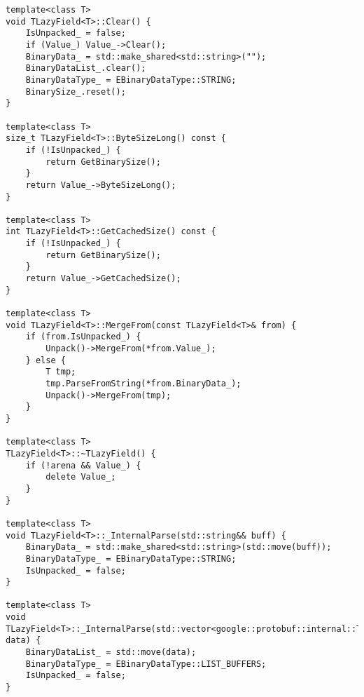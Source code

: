 \begin{lstlisting}[style=CodeListing]
template<class T>
void TLazyField<T>::Clear() {
    IsUnpacked_ = false;
    if (Value_) Value_->Clear();
    BinaryData_ = std::make_shared<std::string>("");
    BinaryDataList_.clear();
    BinaryDataType_ = EBinaryDataType::STRING;
    BinarySize_.reset();
}

template<class T>
size_t TLazyField<T>::ByteSizeLong() const {
    if (!IsUnpacked_) {
        return GetBinarySize();
    }
    return Value_->ByteSizeLong();
}

template<class T>
int TLazyField<T>::GetCachedSize() const {
    if (!IsUnpacked_) {
        return GetBinarySize();
    }
    return Value_->GetCachedSize();
}

template<class T>
void TLazyField<T>::MergeFrom(const TLazyField<T>& from) {
    if (from.IsUnpacked_) {
        Unpack()->MergeFrom(*from.Value_);
    } else {
        T tmp;
        tmp.ParseFromString(*from.BinaryData_);
        Unpack()->MergeFrom(tmp);
    }
}

template<class T>
TLazyField<T>::~TLazyField() {
    if (!arena && Value_) {
        delete Value_;
    }
}

template<class T>
void TLazyField<T>::_InternalParse(std::string&& buff) {
    BinaryData_ = std::make_shared<std::string>(std::move(buff));
    BinaryDataType_ = EBinaryDataType::STRING;
    IsUnpacked_ = false;
}

template<class T>
void TLazyField<T>::_InternalParse(std::vector<google::protobuf::internal::TLazyRefBuffer> data) {
    BinaryDataList_ = std::move(data);
    BinaryDataType_ = EBinaryDataType::LIST_BUFFERS;
    IsUnpacked_ = false;
}
\end{lstlisting}
\pagebreak

